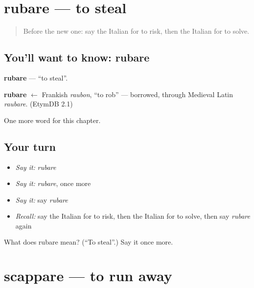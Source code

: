 \section[rubare]{rubare — to steal}

\label{lesson:IT-C181-rubare}



\begin{quote}
Before the new one: say the Italian for to risk, then the Italian for to solve.
\end{quote}

\subsection*{You'll want to know: rubare}
\textbf{rubare} — \textquotedblleft{}to steal\textquotedblright{}.

\begin{cousinweb}
\textbf{rubare} $\leftarrow$ Frankish \emph{raubon}, \textquotedblleft{}to rob\textquotedblright{} — borrowed, through Medieval Latin \emph{raubare}. (EtymDB 2.1)
\end{cousinweb}

\begin{grammarlens}[title={What you've built}]
One more word for this chapter.
\end{grammarlens}

\subsection*{Your turn}
\begin{itemize}
\raggedright
  \item \emph{Say it:} \emph{rubare}
  \item \emph{Say it:} \emph{rubare}, once more
  \item \emph{Say it:} say \emph{rubare}
  \item \emph{Recall:} say the Italian for to risk, then the Italian for to solve, then say \emph{rubare} again
\end{itemize}

\begin{tcolorbox}[breakable,colback=teal!4,colframe=teal!35!black,title={Before you move on}]
What does rubare mean? (\textquotedblleft{}To steal\textquotedblright{}.) Say it once more.
\end{tcolorbox}
\section[scappare]{scappare — to run away}

